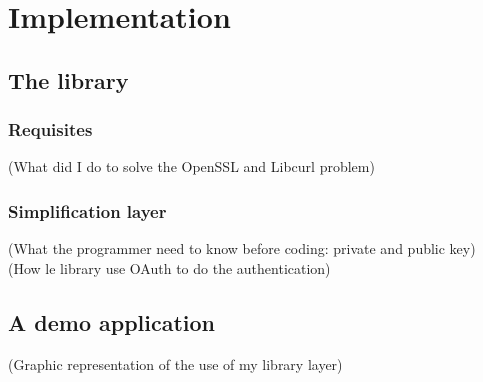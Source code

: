 \chapter{Implementation}

\section{The library}

\subsection{Requisites}

(What did I do to solve the OpenSSL and Libcurl problem)


\subsection{Simplification layer}

(What the programmer need to know before coding: private and public key)\\
(How le library use OAuth to do the authentication)



\section{A demo application}

(Graphic representation of the use of my library layer)


\clearpage